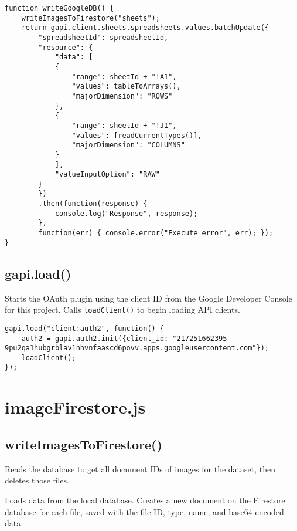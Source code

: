 \documentclass[letterpaper]{article}
\begin{document}
\begin{lstlisting}[firstnumber=194]
function writeGoogleDB() {
    writeImagesToFirestore("sheets");
    return gapi.client.sheets.spreadsheets.values.batchUpdate({
        "spreadsheetId": spreadsheetId,
        "resource": {
            "data": [
            {
                "range": sheetId + "!A1",
                "values": tableToArrays(),
                "majorDimension": "ROWS"
            },
            {
                "range": sheetId + "!J1",
                "values": [readCurrentTypes()],
                "majorDimension": "COLUMNS"
            }
            ],
            "valueInputOption": "RAW"
        }
        })
        .then(function(response) {
            console.log("Response", response);
        },
        function(err) { console.error("Execute error", err); });
}
\end{lstlisting}

\subsection{gapi.load()}

Starts the OAuth plugin using the client ID from the Google Developer Console for this project.
Calls \lstinline{loadClient()} to begin loading API clients.

\begin{lstlisting}[firstnumber=220]
gapi.load("client:auth2", function() {
    auth2 = gapi.auth2.init({client_id: "217251662395-9pu2qa1hubgrblav1nhvnfaascd6povv.apps.googleusercontent.com"});
    loadClient();
});
\end{lstlisting}

\newpage

\section{imageFirestore.js}

\subsection{writeImagesToFirestore()}

Reads the database to get all document IDs of images for the dataset, then deletes those files.

Loads data from the local database.
Creates a new document on the Firestore database for each file, saved with the file ID, type, name, and base64 encoded data.
\end{document}
